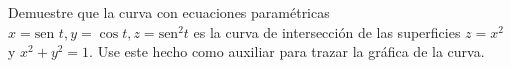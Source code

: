 \item Demuestre que la curva con ecuaciones paramétricas $x = \text{sen } t, y = \cos t, z = \text{sen}^2 t$ es la curva de intersección de las superficies $z = x^2$ y $x^2 + y^2 = 1$. Use este hecho como auxiliar para trazar la gráfica de la curva.
